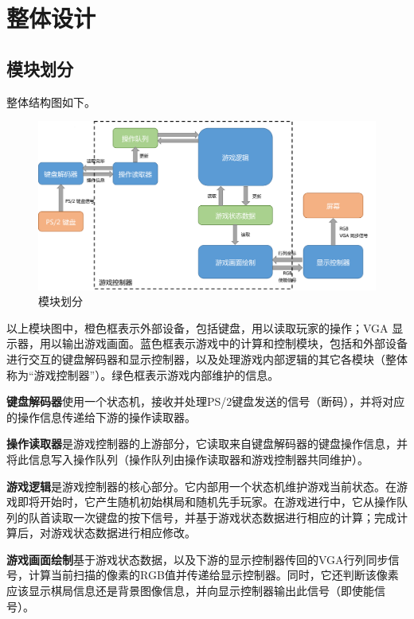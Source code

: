 \section{整体设计}
\subsection{模块划分} 
整体结构图如下。

\begin{figure}[H]
    \centering
    \includegraphics[scale=0.22]{images/structure.png}
    \caption{模块划分}
    \label{fig:structure}
\end{figure}

以上模块图中，橙色框表示外部设备，包括键盘，用以读取玩家的操作；VGA 显示器，用以输出游戏画面。蓝色框表示游戏中的计算和控制模块，包括和外部设备进行交互的键盘解码器和显示控制器，以及处理游戏内部逻辑的其它各模块（整体称为“游戏控制器”）。绿色框表示游戏内部维护的信息。

\textbf{键盘解码器}使用一个状态机，接收并处理PS/2键盘发送的信号（断码），并将对应的操作信息传递给下游的操作读取器。

\textbf{操作读取器}是游戏控制器的上游部分，它读取来自键盘解码器的键盘操作信息，并将此信息写入操作队列（操作队列由操作读取器和游戏控制器共同维护）。

\textbf{游戏逻辑}是游戏控制器的核心部分。它内部用一个状态机维护游戏当前状态。在游戏即将开始时，它产生随机初始棋局和随机先手玩家。在游戏进行中，它从操作队列的队首读取一次键盘的按下信号，并基于游戏状态数据进行相应的计算；完成计算后，对游戏状态数据进行相应修改。

\textbf{游戏画面绘制}基于游戏状态数据，以及下游的显示控制器传回的VGA行列同步信号，计算当前扫描的像素的RGB值并传递给显示控制器。同时，它还判断该像素应该显示棋局信息还是背景图像信息，并向显示控制器输出此信号（即使能信号）。


